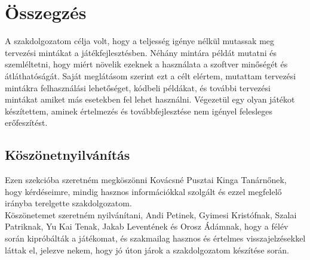 \chapter{Összegzés} %
\label{ch:sum}
A szakdolgozatom célja volt, hogy a teljesség igénye nélkül mutassak meg tervezési mintákat a játékfejlesztésben. Néhány mintára példát mutatni és szemléltetni, hogy miért növelik ezeknek a használata a szoftver minőségét és átláthatóságát. Saját meglátásom szerint ezt a célt elértem, mutattam tervezési mintákra felhasználási lehetőséget, kódbeli példákat, és további tervezési mintákat amiket más esetekben fel lehet használni. Végezetül egy olyan játékot készítettem, aminek értelmezés és továbbfejlesztése nem igényel felesleges erőfeszítést.

\section{Köszönetnyilvánítás}
Ezen szekcióba szeretném megköszönni Kovácsné Pusztai Kinga Tanárnőnek, hogy kérdéseimre, mindig hasznos információkkal szolgált és ezzel megfelelő irányba terelgette szakdolgozatom.\\
Köszönetemet szeretném nyilvánítani, Andi Petinek, Gyimesi Kristófnak, Szalai Patriknak, Yu Kai Tenak, Jakab Leventének és Orosz Ádámnak, hogy a félév során kipróbálták a játékomat, és szakmailag hasznos és értelmes visszajelzésekkel láttak el, jelezve nekem, hogy jó úton járok a szakdolgozatom készítése során.

